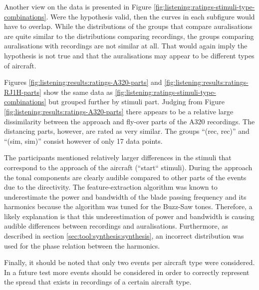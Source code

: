 

Another view on the data is presented in Figure
\ref{fig:listening:ratings-stimuli-type-combinations}. Were the hypothesis
valid, then the curves in each subfigure would have to overlap. While the
distributions of the groups that compare auralisations are quite similar to the
distributions comparing recordings, the groups comparing auralisations with
recordings are not similar at all. That would again imply the hypothesis is not
true and that the auralisations may appear to be different types of aircraft.


Figures \ref{fig:listening:results:ratings-A320-parts} and
\ref{fig:listening:results:ratings-RJ1H-parts} show the same data as \ref{fig:listening:ratings-stimuli-type-combinations}
but grouped further by stimuli part. Judging from Figure
\ref{fig:listening:results:ratings-A320-parts} there appears to be a
relative large dissimilarity between the approach and fly-over parts of the A320 recordings.
The distancing parts, however, are rated as very similar. The groups ``(rec,
rec)'' and ``(sim, sim)'' consist however of only 17 data points.


The participants mentioned relatively larger differences in the stimuli that
correspond to the approach of the aircraft (``start`` stimuli). During the
approach the tonal components are clearly audible compared to other parts of the
events due to the directivity. The feature-extraction algorithm was known to
underestimate the power and bandwidth of the blade passing frequency and its
harmonics because the algorithm was tuned for the Buzz-Saw tones. Therefore, a
likely explanation is that this underestimation of power and bandwidth is
causing audible differences between recordings and auralisations.
Furthermore, as described in section \ref{sec:tool:synthesis:synthesis}, an
incorrect distribution was used for the phase relation between the harmonics.

Finally, it should be noted that only two events per aircraft type were
considered. In a future test more events should be considered in order to
correctly represent the spread that exists in recordings of a certain aircraft
type.
